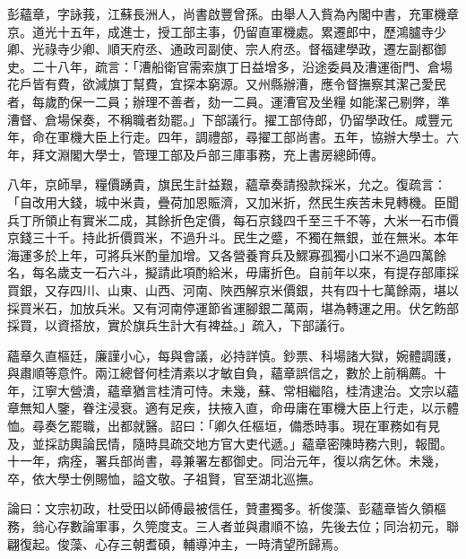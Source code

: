 \begin{pinyinscope}
彭蘊章，字詠莪，江蘇長洲人，尚書啟豐曾孫。由舉人入貲為內閣中書，充軍機章京。道光十五年，成進士，授工部主事，仍留直軍機處。累遷郎中，歷鴻臚寺少卿、光祿寺少卿、順天府丞、通政司副使、宗人府丞。督福建學政，遷左副都御史。二十八年，疏言：「漕船衛官需索旗丁日益增多，沿途委員及漕運衙門、倉場花戶皆有費，欲減旗丁幫費，宜探本窮源。又州縣辦漕，應令督撫察其潔己愛民者，每歲酌保一二員；辦理不善者，劾一二員。運漕官及坐糧如能潔己剔弊，準漕督、倉場保奏，不稱職者劾罷。」下部議行。擢工部侍郎，仍留學政任。咸豐元年，命在軍機大臣上行走。四年，調禮部，尋擢工部尚書。五年，協辦大學士。六年，拜文淵閣大學士，管理工部及戶部三庫事務，充上書房總師傅。

八年，京師旱，糧價踴貴，旗民生計益艱，蘊章奏請撥款採米，允之。復疏言：「自改用大錢，城中米貴，疊荷加恩賑濟，又加米折，然民生疾苦未見轉機。臣聞兵丁所領止有實米二成，其餘折色定價，每石京錢四千至三千不等，大米一石市價京錢三十千。持此折價買米，不過升斗。民生之蹙，不獨在無銀，並在無米。本年海運多於上年，可將兵米酌量加增。又各營養育兵及鰥寡孤獨小口米不過四萬餘名，每名歲支一石六斗，擬請此項酌給米，毋庸折色。自前年以來，有提存部庫採買銀，又存四川、山東、山西、河南、陜西解京米價銀，共有四十七萬餘兩，堪以採買米石，加放兵米。又有河南停運節省運腳銀二萬兩，堪為轉運之用。伏乞飭部採買，以資搭放，實於旗兵生計大有裨益。」疏入，下部議行。

蘊章久直樞廷，廉謹小心，每與會議，必持詳慎。鈔票、科場諸大獄，婉體調護，與肅順等意忤。兩江總督何桂清素以才敏自負，蘊章誤信之，數於上前稱薦。十年，江寧大營潰，蘊章猶言桂清可恃。未幾，蘇、常相繼陷，桂清逮治。文宗以蘊章無知人鑒，眷注浸衰。適有足疾，扶掖入直，命毋庸在軍機大臣上行走，以示體恤。尋奏乞罷職，出都就醫。詔曰：「卿久任樞垣，備悉時事。現在軍務如有見及，並採訪輿論民情，隨時具疏交地方官大吏代遞。」蘊章密陳時務六則，報聞。十一年，病痊，署兵部尚書，尋兼署左都御史。同治元年，復以病乞休。未幾，卒，依大學士例賜恤，謚文敬。子祖賢，官至湖北巡撫。

論曰：文宗初政，杜受田以師傅最被信任，贊畫獨多。祈俊藻、彭蘊章皆久領樞務，翁心存數論軍事，久筦度支。三人者並與肅順不協，先後去位；同治初元，聯翩復起。俊藻、心存三朝耆碩，輔導沖主，一時清望所歸焉。


\end{pinyinscope}